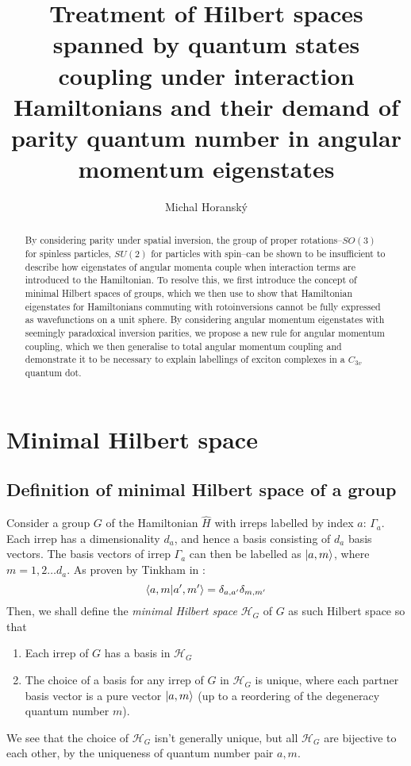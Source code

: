 \documentclass[12pt]{article}
\begin{document}
	\title{Treatment of Hilbert spaces spanned by quantum states coupling under interaction Hamiltonians and their demand of parity quantum number in angular momentum eigenstates}
	\author{Michal Horanský}
	\maketitle
	
	\begin{abstract}
	By considering parity under spatial inversion, the group of proper rotations--$SO(3)$ for spinless particles, $SU(2)$ for particles with spin--can be shown to be insufficient to describe how eigenstates of angular momenta couple when interaction terms are introduced to the Hamiltonian. To resolve this, we first introduce the concept of minimal Hilbert spaces of groups, which we then use to show that Hamiltonian eigenstates for Hamiltonians commuting with rotoinversions cannot be fully expressed as wavefunctions on a unit sphere. By considering angular momentum eigenstates with seemingly paradoxical inversion parities, we propose a new rule for angular momentum coupling, which we then generalise to total angular momentum coupling and demonstrate it to be necessary to explain labellings of exciton complexes in a $C_{3v}$ quantum dot.
	\end{abstract}
	
	\section{Minimal Hilbert space}
	
	\subsection{Definition of minimal Hilbert space of a group}
	
	Consider a group $G$ of the Hamiltonian $\hat{H}$ with irreps labelled by index $a$: $\Gamma_a$. Each irrep has a dimensionality $d_a$, and hence a basis consisting of $d_a$ basis vectors. The basis vectors of irrep $\Gamma_a$ can then be labelled as $\ket{a,m}$, where $m=1,2\dots d_a$. As proven by Tinkham in \cite[p.41-2]{tinkham}:
	$$\braket{a,m}{a',m'}=\delta_{a,a'}\delta_{m,m'}$$
	Then, we shall define the \textit{minimal Hilbert space} $\mathcal{H}_G$ of $G$ as such Hilbert space so that
	\begin{enumerate}
	\item Each irrep of $G$ has a basis in $\mathcal{H}_G$
	\item The choice of a basis for any irrep of $G$ in $\mathcal{H}_G$ is unique, where each partner basis vector is a pure vector $\ket{a,m}$ (up to a reordering of the degeneracy quantum number $m$).
	\end{enumerate}
	We see that the choice of $\mathcal{H}_G$ isn't generally unique, but all $\mathcal{H}_G$ are bijective to each other, by the uniqueness of quantum number pair $a,m$.
	
\end{document}
